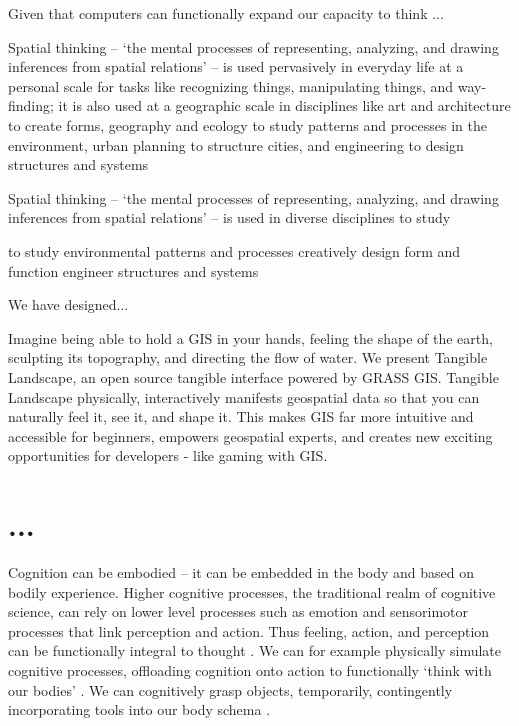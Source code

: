 Given that computers can functionally expand our capacity to think \citep{Kirsh2013}
...




Spatial thinking -- `the mental processes of representing, analyzing, and drawing inferences from spatial relations' \cite{Uttal2013} -- 
is used pervasively in everyday life at a personal scale for tasks like recognizing things, manipulating things, and way-finding; 
it is also used at a geographic scale in disciplines like 
art and architecture to create forms, 
geography and ecology to study patterns and processes in the environment, 
urban planning to structure cities,
and 
engineering to design structures and systems









Spatial thinking -- `the mental processes of representing, analyzing, and drawing inferences from spatial relations' \cite{Uttal2013} -- is used in diverse disciplines to study 



to
study environmental patterns and processes
creatively design form and function
engineer structures and systems






We have designed...

Imagine being able to hold a GIS in your hands, feeling the shape of the earth, sculpting its topography, and directing the flow of water. We present Tangible Landscape, an open source tangible interface powered by GRASS GIS. Tangible Landscape physically, interactively manifests geospatial data so that you can naturally feel it, see it, and shape it. This makes GIS far more intuitive and accessible for beginners, empowers geospatial experts, and creates new exciting opportunities for developers - like gaming with GIS. 


\section{...}



Cognition can be embodied -- it can be embedded in the body and based on bodily experience. 
Higher cognitive processes, the traditional realm of cognitive science, 
can rely on lower level processes such as emotion and sensorimotor processes that link perception and action. 
Thus feeling, action, and perception can be functionally integral to thought \cite{Hardy-Vallee2008}. 
We can for example physically simulate cognitive processes, offloading cognition onto action to functionally `think with our bodies' \cite{Kirsh2013}. 
We can cognitively grasp objects, temporarily, contingently incorporating tools into our body schema \cite{Kirsh2013}.


